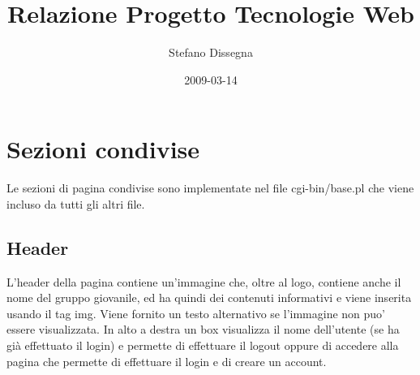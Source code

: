 \documentclass[a4paper,10pt]{article}
\author{Stefano Dissegna}
\title{Relazione Progetto Tecnologie Web}
\date{2009-03-14}
\begin{document}
\maketitle

\section{Sezioni condivise}
Le sezioni di pagina condivise sono implementate nel file cgi-bin/base.pl che viene incluso da tutti gli altri file.

\subsection{Header}
L'header della pagina contiene un'immagine che, oltre al logo, contiene anche il
nome del gruppo giovanile, ed ha quindi dei contenuti informativi e viene inserita usando il tag 
img. Viene fornito un testo alternativo se l'immagine non puo' essere visualizzata.
In alto a destra un box visualizza il nome dell'utente (se ha gi\`a effettuato il login) e permette
di effettuare il logout oppure di accedere alla pagina che permette di effettuare il login e di creare un account.
\end{document}
